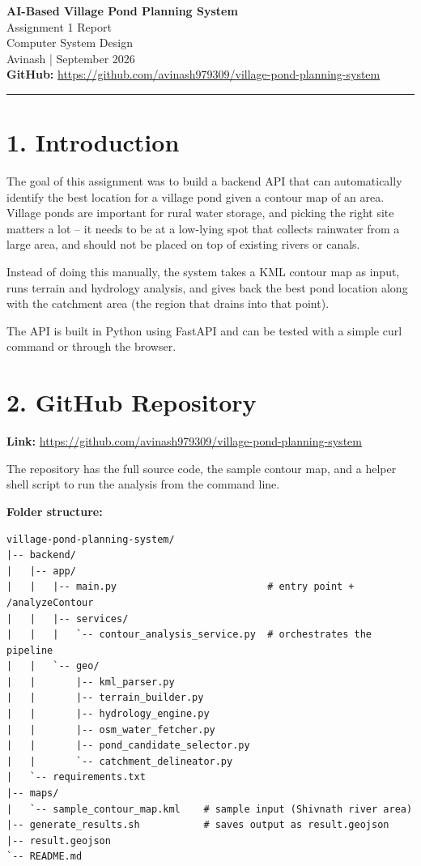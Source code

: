 \documentclass[12pt,a4paper]{article}
\begin{document}
\begin{center}
  {\Large \textbf{AI-Based Village Pond Planning System}} \\[0.5em]
  {\large Assignment 1 Report} \\[0.3em]
  Computer System Design \\[0.3em]
  Avinash \quad | \quad September 2026 \\[0.3em]
  \textbf{GitHub:} \url{https://github.com/avinash979309/village-pond-planning-system}
\end{center}

\vspace{0.5em}
\hrule
\vspace{1em}

\section*{1. Introduction}

The goal of this assignment was to build a backend API that can automatically
identify the best location for a village pond given a contour map of an area.
Village ponds are important for rural water storage, and picking the right site
matters a lot -- it needs to be at a low-lying spot that collects rainwater
from a large area, and should not be placed on top of existing rivers or canals.

Instead of doing this manually, the system takes a KML contour map as input,
runs terrain and hydrology analysis, and gives back the best pond location
along with the catchment area (the region that drains into that point).

The API is built in Python using FastAPI and can be tested with a simple
curl command or through the browser.

\section*{2. GitHub Repository}

\textbf{Link:} \url{https://github.com/avinash979309/village-pond-planning-system}

The repository has the full source code, the sample contour map, and a helper
shell script to run the analysis from the command line.

\textbf{Folder structure:}

\begin{lstlisting}
village-pond-planning-system/
|-- backend/
|   |-- app/
|   |   |-- main.py                          # entry point + /analyzeContour
|   |   |-- services/
|   |   |   `-- contour_analysis_service.py  # orchestrates the pipeline
|   |   `-- geo/
|   |       |-- kml_parser.py
|   |       |-- terrain_builder.py
|   |       |-- hydrology_engine.py
|   |       |-- osm_water_fetcher.py
|   |       |-- pond_candidate_selector.py
|   |       `-- catchment_delineator.py
|   `-- requirements.txt
|-- maps/
|   `-- sample_contour_map.kml    # sample input (Shivnath river area)
|-- generate_results.sh           # saves output as result.geojson
|-- result.geojson
`-- README.md
\end{lstlisting}
\end{document}
